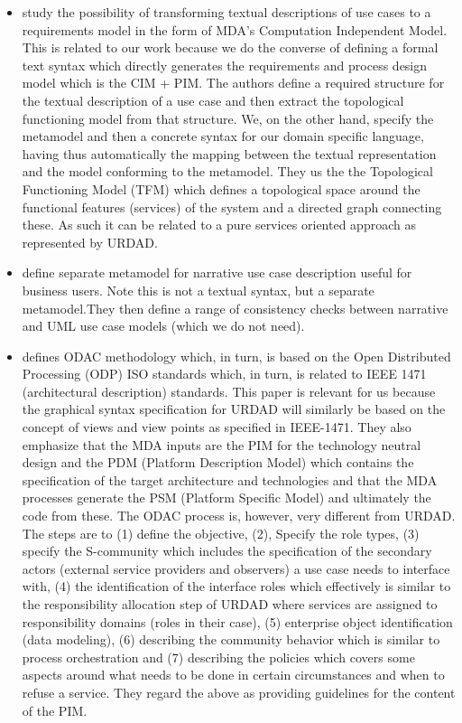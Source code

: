   \begin{itemize}
   \item \cite{osis_transforming_2010} study the possibility of transforming textual descriptions of use cases to a requirements model in the form of MDA's Computation Independent Model. This is related to our work because we do the converse of defining a formal text syntax which directly generates the requirements and process design model which is the CIM + PIM. The authors define a required structure for the textual description of a use case and then extract the topological functioning model from that structure. We, on the other hand, specify the metamodel and then a concrete syntax for our domain specific language, having thus automatically the mapping between the textual representation and the model conforming to the metamodel. They us the the Topological Functioning Model (TFM) which defines a topological space around the functional features (services) of the system and a directed graph connecting these. As such it can be related to a pure services oriented approach as represented by URDAD.
   \item \cite{hoffmann_towards_2009} define separate metamodel for narrative use case description useful for business users. Note this is not a textual syntax, but a separate metamodel.They then define a range of consistency checks between narrative and UML use case models (which we do not need). 
   \item \cite{gervais_towards_2002} defines ODAC methodology which, in turn, is based on the Open Distributed Processing (ODP) ISO standards which, in turn, is related to IEEE 1471 (architectural description) standards. This paper is relevant for us because the graphical syntax specification for URDAD will similarly be based on the concept of views and view points as specified in IEEE-1471. They also emphasize that the MDA inputs are the PIM for the technology neutral design and the PDM (Platform Description Model) which contains the specification of the target architecture and technologies and that the MDA processes generate the PSM (Platform Specific Model) and ultimately the code from these. The ODAC process is, however, very different from URDAD. The steps are to (1) define the objective, (2), Specify the role types, (3) specify the S-community which includes the specification of the secondary actors (external service providers and observers) a use case needs to interface with, (4) the identification of the interface roles which effectively is similar to the responsibility allocation step of URDAD where services are assigned to responsibility domains (roles in their case), (5) enterprise object identification (data modeling), (6) describing the community behavior which is similar to process orchestration and (7) describing the policies which covers some aspects around what needs to be done in certain circumstances and when to refuse a service. They regard the above as providing guidelines for the content of the PIM.

\end{itemize}
